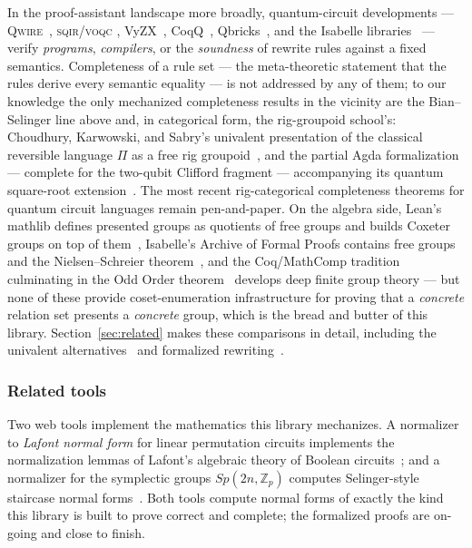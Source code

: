 In the proof-assistant landscape more broadly, quantum-circuit developments
--- \textsc{Qwire}~\cite{paykin2017qwire}, \textsc{sqir}/\textsc{voqc}
\cite{hietala2021voqc,hietala2021proving}, VyZX~\cite{lehmann2025vyzx},
CoqQ~\cite{zhou2023coqq}, Qbricks~\cite{chareton2021qbricks}, and the
Isabelle libraries~\cite{liu2019quantum,bordg2020dirac} --- verify
\emph{programs}, \emph{compilers}, or the \emph{soundness} of rewrite rules
against a fixed semantics.  Completeness of a rule set --- the meta-theoretic
statement that the rules derive every semantic equality --- is not addressed
by any of them; to our knowledge the only mechanized completeness results in
the vicinity are the Bian--Selinger line above and, in categorical form, the
rig-groupoid school's: Choudhury, Karwowski, and Sabry's univalent
presentation of the classical reversible language $\Pi$ as a free rig
groupoid~\cite{choudhury2022symmetries}, and the partial Agda formalization
--- complete for the two-qubit Clifford fragment --- accompanying its
quantum square-root extension~\cite{carette2024squareroots}.  The most
recent rig-categorical completeness theorems for quantum circuit languages
\cite{fang2026hadamard,heunen2026onerig} remain pen-and-paper.  On the algebra side, Lean's mathlib defines presented groups as
quotients of free groups and builds Coxeter groups on top of
them~\cite{mathlib2020,mathlib-doc-presented}, Isabelle's Archive of Formal
Proofs contains free groups and the Nielsen--Schreier
theorem~\cite{breitner2010freegroups,kharim2023freegroups}, and the
Coq/MathComp tradition culminating in the Odd Order
theorem~\cite{gonthier2013oddorder} develops deep finite group theory ---
but none of these provide coset-enumeration infrastructure for proving that
a \emph{concrete} relation set presents a \emph{concrete} group, which is
the bread and butter of this library.  Section~\ref{sec:related} makes these
comparisons in detail, including the univalent
alternatives~\cite{vezzosi2019cubical,cubicallibrary,agdaunimath,
mangel2023sign} and formalized rewriting~\cite{sternagel2013kb,
hirokawa2019abstract}.

\subsubsection{Related tools}\label{sec:tools}

Two web tools implement the mathematics this library mechanizes.  A
normalizer to \emph{Lafont normal form} for linear permutation circuits
implements the normalization lemmas of Lafont's algebraic theory of Boolean
circuits~\cite{lafont2003boolean,lafontlp-tool}; and a normalizer for the
symplectic groups $Sp(2n,\mathbb{Z}_p)$ computes Selinger-style staircase
normal forms~\cite{qupit-tool}.  Both tools compute normal forms of
exactly the kind this library is built to prove correct and complete; the formalized proofs are on-going and close to finish.

